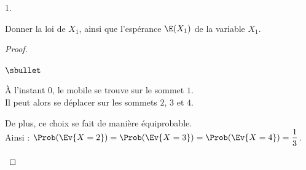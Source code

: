 \begin{noliste}{1.}
  \setlength{\itemsep}{4mm}
\item Donner la loi de $X_{1}$, ainsi que l'espérance $\E(X_{1})$ de
  la variable $X_{1}$.

  \begin{proof}~%
    \begin{noliste}{$\sbullet$} 
    \item À l'instant $0$, le mobile se trouve sur le sommet $1$.\\
      Il peut alors se déplacer sur les sommets $2$, $3$ et $4$.%

    \item De plus, ce choix se fait de manière équiprobable.\\ %
      Ainsi : $\Prob(\Ev{X = 2}) = \Prob(\Ev{X = 3}) = \Prob(\Ev{X =
        4}) = \dfrac{1}{3}$.%


\end{noliste}
\end{proof}
\end{noliste}
